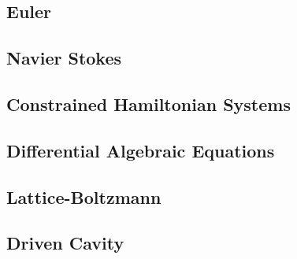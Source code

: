 \documentclass[12pt]{article}
\begin{document}
\subsection{Euler}


\subsection{Navier Stokes}

\subsection{Constrained Hamiltonian Systems}

\subsection{Differential Algebraic Equations}


\subsection{Lattice-Boltzmann}


\subsection{Driven Cavity}
\end{document}
